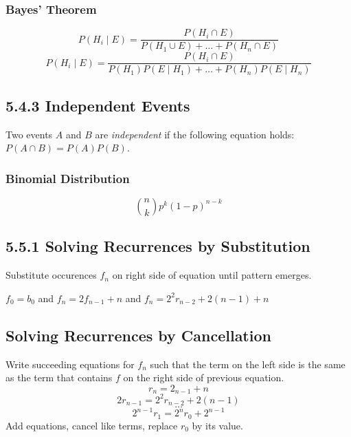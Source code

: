 \documentclass[10pt,twocolumn]{article}
\begin{document}
	\subsubsection*{Bayes' Theorem}
	\[P(H_i\mid E)=\frac{P(H_i\cap E)}{P(H_1\cup E)+\ldots+P(H_n\cap E)}\]
	\[P(H_i\mid E)=\frac{P(H_i\cap E)}{P(H_1)P(E\mid H_1)+\ldots+P(H_n)P(E\mid  H_n)}\]
	
	\subsection*{5.4.3 Independent Events}
	
	Two events $A$ and $B$ are \emph{independent} if the following
        equation holds: $P(A \cap B)=P(A)P(B)$.
	
	\subsubsection*{Binomial Distribution}
	\[\binom{n}{k}p^k(1-p)^{n-k}\]

	\subsection*{5.5.1 Solving Recurrences by Substitution}
	Substitute occurences $f_n$ on right side of equation until pattern emerges.
	\begin{flushleft}$f_0=b_0$ and $f_n=2f_{n-1}+n$ and $f_n=2^2r_{n-2}+2(n-1)+n$\end{flushleft}
	
	\subsection*{Solving Recurrences by Cancellation}
	Write succeeding equations for $f_n$ such that the term on the
        left side is the same as the term that contains $f$ on the
        right side of previous equation.
		\[r_n=2_{n-1}+n\]
		\[2r_{n-1}=2^2r_{n-2}+2(n-1)\]
		\[\ldots\]
		\[2^{n-1}r_1=2^nr_0+2^{n-1}\]
	Add equations, cancel like terms, replace $r_0$ by its value.
	
\end{document}
